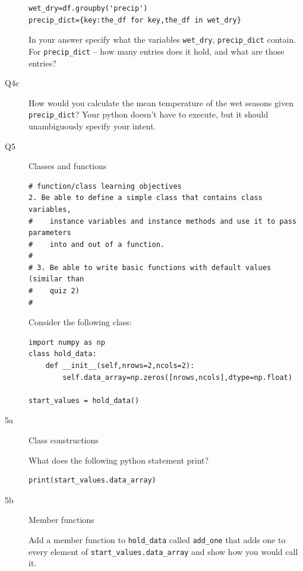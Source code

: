 \documentclass{article}
\begin{document}
\begin{description}
\begin{verbatim}  
wet_dry=df.groupby('precip')
precip_dict={key:the_df for key,the_df in wet_dry}
\end{verbatim}  

  In your answer specify what the variables \verb+wet_dry+,
  \verb+precip_dict+ contain.  For \verb+precip_dict+ -- how many entries
  does it hold, and what are those entries?


\item[Q4c]

  How would you calculate the mean temperature of the wet seasons given \verb+precip_dict+?
  Your python doesn't have to execute, but it should unambiguously specify your
  intent.

  
\item[Q5] Classes and functions

\begin{verbatim}
# function/class learning objectives
2. Be able to define a simple class that contains class variables,
#    instance variables and instance methods and use it to pass parameters
#    into and out of a function.
#
# 3. Be able to write basic functions with default values (similar than
#    quiz 2)
#
\end{verbatim}

  
Consider the following class:
  
\begin{lstlisting}
import numpy as np
class hold_data:
    def __init__(self,nrows=2,ncols=2):
        self.data_array=np.zeros([nrows,ncols],dtype=np.float)

start_values = hold_data()
\end{lstlisting}

\item[5a] Class constructions

  What does the following python statement print?

\begin{verbatim}
print(start_values.data_array)
\end{verbatim}

\item[5b] Member functions

  Add a member function to \verb+hold_data+ called \verb+add_one+ that adds one to every element
  of \verb+start_values.data_array+ and show how you would call it.


\end{description}
\end{document}
